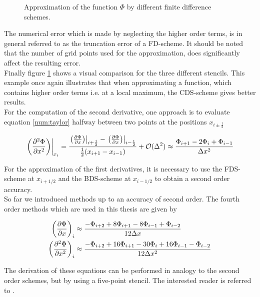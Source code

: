 \begin{figure}[!btp]
  \centering
  \caption{Approximation of the function $\Phi$ by different finite difference schemes.}
  \label{num:fd_image}
\end{figure}

The numerical error which is made by neglecting the higher order terms, is in general referred to as the truncation error of a FD-scheme.
It should be noted that the number of grid points used for the approximation, does significantly affect the resulting error.\\
Finally figure \ref{num:fd_image} shows a visual comparison for the three different stencils.
This example once again illustrates that when approximating a function, which contains higher order terms i.e. at a local maximum,
the  CDS-scheme gives better results.\\
For the computation of the second derivative, one approach is to evaluate equation \ref{num:taylor} halfway between two points at the positions $x_{i\pm\frac{1}{2}}$

\begin{align}
    \label{numerik:eq_2dfo2}
    \left.\left(\pdn[^2\Phi]{x^2}\right)\right|_{x_i} =
     \frac{\left.\left(\pdn[\Phi]{x}\right)\right|_{i+\frac{1}{2}}-
     \left.\left(\pdn[\Phi]{x}\right)\right|_{i-\frac{1}{2}}}
    {\frac{1}{2}(x_{i+1} - x_{i-1})} + \mathcal{O}(\Delta ^2)  \approx
    \frac{\Phi_{i+1} - 2\Phi_i + \Phi_{i-1}}{\Delta x^2}
\end{align}

For the approximation of the first derivatives, it is necessary to use the FDS-scheme at $x_{i+1/2}$ and the BDS-scheme at $x_{i-1/2}$ to obtain
a second order accuracy.\\
So far we introduced methods up to an accuracy of second order. The fourth order methods which are used in this thesis are given by

\begin{align}
    \left(\pdn[\Phi]{x}\right)_i &\approx \frac{-\Phi_{i+2} + 8\Phi_{i+1} - 8\Phi_{i-1} + \Phi_{i-2}}{12\Delta x} \\
    \left(\pdn[^2\Phi]{x^2}\right)_i &\approx \frac{-\Phi_{i+2} + 16\Phi_{i+1} -30\Phi_i + 16\Phi_{i-1} - \Phi_{i-2}}{12\Delta x^2}
    \label{num:fd_o4_methods}
\end{align}

The derivation of these equations can be performed in analogy to the second order schemes, but by using a five-point
stencil. The interested reader is referred to \citep{Fornberg1988}.

